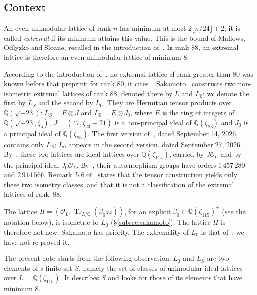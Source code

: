 \documentclass[11pt,a4paper]{amsart}
\theoremstyle{plain}
\theoremstyle{definition}
\numberwithin{equation}{section}
\newcommand{\Q}{\mathbb{Q}}
\newcommand{\OO}{\mathcal{O}}
\DeclareMathOperator{\Tr}{Tr}
\newcommand{\Lz}{L_{0}}
\newcommand{\LS}{L_{S}}
\begin{document}
\subsection{Context}
An even unimodular lattice of rank $n$ has minimum at most $2\lfloor n/24\rfloor+2$; it is called \emph{extremal} if its minimum attains this value. This is the bound of Mallows, Odlyzko and Sloane, recalled in the introduction of~\cite{Sak26}. In rank $88$, an extremal lattice is therefore an even unimodular lattice of minimum $8$.

According to the introduction of~\cite{Sak26}, no extremal lattice of rank greater than $80$ was known before that preprint; for rank $80$, it cites~\cite{BN98,Wat12}. Sakamoto~\cite{Sak26} constructs two non-isometric extremal lattices of rank $88$, denoted there by $L$ and $L_0$; we denote the first by $\LS$ and the second by $\Lz$. They are Hermitian tensor products over $\Q(\sqrt{-23})$: $\LS=E\otimes J$ and $\Lz=E\otimes J_0$, where $E$ is the ring of integers of $\Q(\sqrt{-23},\zeta_5)$, $J=(47,\zeta_{23}-21)$ is a non-principal ideal of $\Q(\zeta_{23})$ and $J_0$ is a principal ideal of $\Q(\zeta_{23})$. The first version of~\cite{Sak26}, dated September 14, 2026, contains only $\LS$; $\Lz$ appears in the second version, dated September 27, 2026. By~\cite[Rem.~3.11]{Sak26}, these two lattices are ideal lattices over $\Q(\zeta_{115})$, carried by $J\OO_L$ and by the principal ideal $J_0\OO_L$. By~\cite[Thm.~A.10]{Sak26}, their automorphism groups have orders $1\,457\,280$ and $2\,914\,560$. Remark~5.6 of~\cite{Sak26} states that the tensor construction yields only these two isometry classes, and that it is not a classification of the extremal lattices of rank~$88$.

The lattice $H=(\OO_L,\Tr_{L/\Q}(\beta_0z\bar z))$, for an explicit $\beta_0\in\Q(\zeta_{115})^+$ (see the notation below), is isometric to $\Lz$ (\S\ref{subsec:sakamoto}). The lattice $H$ is therefore not new: Sakamoto has priority. The extremality of $\Lz$ is that of~\cite[Prop.~5.5]{Sak26}; we have not re-proved it.

The present note starts from the following observation: $\Lz$ and $\LS$ are two elements of a finite set $S$, namely the set of classes of unimodular ideal lattices over $L=\Q(\zeta_{115})$. It describes $S$ and looks for those of its elements that have minimum $8$.
\end{document}
